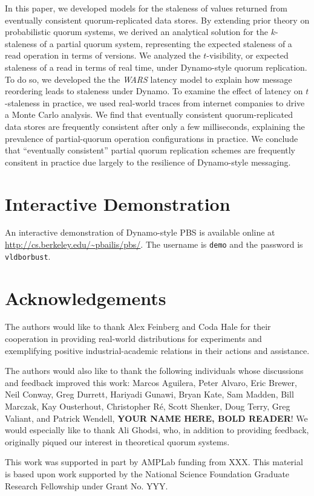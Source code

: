 \documentclass{vldb}
\begin{document}
In this paper, we developed models for the staleness of values
returned from eventually consistent quorum-replicated data stores.  By
extending prior theory on probabilistic quorum systems, we derived an
analytical solution for the $k$-staleness of a partial quorum system,
representing the expected staleness of a read operation in terms of
versions.  We analyzed the $t$-visibility, or expected staleness of a
read in terms of real time, under Dynamo-style quorum replication.  To
do so, we developed the the \textit{WARS} latency model to explain how
message reordering leads to staleness under Dynamo.  To examine the
effect of latency on $t$-staleness in practice, we used real-world
traces from internet companies to drive a Monte Carlo analysis.  We
find that eventually consistent quorum-replicated data stores are
frequently consistent after only a few milliseconds, explaining the
prevalence of partial-quorum operation configurations in practice.  We
conclude that ``eventually consistent'' partial quorum replication
schemes are frequently consitent in practice due largely to the
resilience of Dynamo-style messaging.

\section*{Interactive Demonstration}

An interactive demonstration of Dynamo-style PBS is available online at \url{http://cs.berkeley.edu/~pbailis/pbs/}.  The username is \texttt{demo} and the password is \texttt{vldborbust}.

\section*{Acknowledgements}

The authors would like to thank Alex Feinberg and Coda Hale for their
cooperation in providing real-world distributions for experiments and
exemplifying positive industrial-academic relations in their actions
and assistance.

The authors would also like to thank the following individuals whose
discussions and feedback improved this work: Marcos Aguilera, Peter
Alvaro, Eric Brewer, Neil Conway, Greg Durrett, Hariyadi Gunawi, Bryan
Kate, Sam Madden, Bill Marczak, Kay Ousterhout, Christopher R\'e,
Scott Shenker, Doug Terry, Greg Valiant, and Patrick Wendell,
\textbf{YOUR NAME HERE, BOLD READER}!  We would especially like to thank Ali
Ghodsi, who, in addition to providing feedback, originally piqued our
interest in theoretical quorum systems.

This work was supported in part by AMPLab funding from XXX.  This
material is based upon work supported by the National Science
Foundation Graduate Research Fellowship under Grant No. YYY.

\balance

\footnotesize


\end{document}
